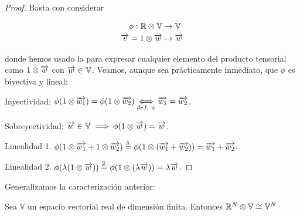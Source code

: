 \begin{proof}
    Basta con considerar

    \begin{equation}
        \begin{split}
            \phi: \mathbb{R} \otimes \mathbb{V} &\to \mathbb{V} \\
            \overrightarrow{v} = 1 \otimes \overrightarrow{w} &\mapsto \overrightarrow{w}
        \end{split}
    \end{equation}

    donde hemos usado la  para expresar cualquier elemento del producto tensorial como $1 \otimes \overrightarrow{w}$ con $\overrightarrow{w} \in \mathbb{V}$. Veamos, aunque sea prácticamente inmediato, que $\phi$ es biyectiva y lineal:

    Inyectividad: $\phi(1 \otimes \overrightarrow{w_1}) = \phi(1 \otimes \overrightarrow{w_2}) \underset{def.\ \phi}{\Longleftrightarrow} \overrightarrow{w_1} = \overrightarrow{w_2}$.

    Sobreyectividad: $\overrightarrow{w} \in \mathbb{V} \implies \phi(1 \otimes \overrightarrow{w}) = \overrightarrow{w}$.

    Linealidad 1. $\phi(1 \otimes \overrightarrow{w_1} + 1 \otimes \overrightarrow{w_2}) \stackrel{\text{3.}}{=} \phi(1 \otimes (\overrightarrow{w_1} + \overrightarrow{w_2})) = \overrightarrow{w_1} + \overrightarrow{w_2}$.

    Linealidad 2. $\phi(\lambda (1 \otimes \overrightarrow{w})) \stackrel{\text{2.}}{=} \phi(1 \otimes (\lambda \overrightarrow{w})) = \lambda \overrightarrow{w}$.

\end{proof}

Generalizamos la caracterización anterior:

\begin{proposicion} Sea $\mathbb{V}$ un espacio vectorial real de dimensión finita. Entonces $\mathbb{R}^N \otimes \mathbb{V}  \cong \mathbb{V}^N$
\end{proposicion}

